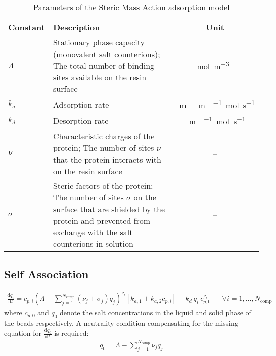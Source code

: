 \begin{table}[!ht]
  \footnotesize
  \begin{tabu}to \linewidth[m]{lX[m]c}
    \toprule
      \textbf{Constant} & \textbf{Description} & \textbf{Unit} \\
    \midrule
      $\Lambda$ & Stationary phase capacity (monovalent salt counterions); The total number of binding sites available on the resin surface & \si{\mol\per\cubic\metre{}} \\ \midrule
      $k_a$ & Adsorption rate & \si{\metre{}\metre{}\per{}\mol\per\second} \\ \midrule
      $k_d$ & Desorption rate & \si{\metre{}\per{}\mol\per\second} \\ \midrule
      $\nu$ & Characteristic charges of the protein; The number of sites $\nu$ that the protein interacts with on the resin surface & -- \\ \midrule
      $\sigma$ & Steric factors of the protein; The number of sites $\sigma$ on the surface that are shielded by the protein and prevented from exchange with the salt counterions in solution & -- \\
    \bottomrule
  \end{tabu}
  \caption{Parameters of the Steric Mass Action adsorption model}
\end{table}

\subsection{Self Association}

\begin{align*}
  \frac{\mathrm{d} q_i}{\mathrm{d} t} = c_{p,i}\left( \Lambda - \sum_{j=1}^{N_{\text{comp}}} \left( \nu_j + \sigma_j \right) q_j \right)^{\nu_i} \left[ k_{a,1} + k_{a,2} c_{p,i} \right] - k_d\: q_i\: c_{p,0}^{\nu_i} && \forall i = 1, \dots, N_{\text{comp}}
\end{align*}
where $c_{p,0}$ and $q_0$ denote the salt concentrations in the liquid and solid phase of the beads respectively. A neutrality condition compensating for the missing equation for $\frac{\mathrm{d} q_0}{\mathrm{d}t}$ is required:
\begin{align*}
  q_0 = \Lambda - \sum_{j=1}^{N_{\text{comp}}} \nu_j q_j
\end{align*}

